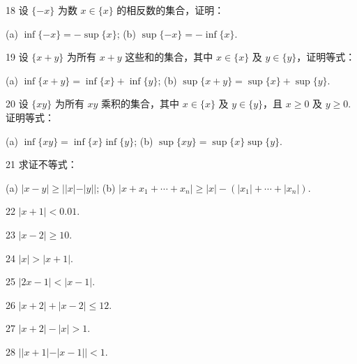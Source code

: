 \begin{prob}[M]{18}
设 $\{-x\}$ 为数 $x \in \{x\}$ 的相反数的集合，证明：

(a) $\inf\{-x\} = -\sup\{x\}$; \qquad (b) $\sup\{-x\} = -\inf\{x\}$.
\end{prob}

\begin{prob}[M]{19}
设 $\{x+y\}$ 为所有 $x+y$ 这些和的集合，其中 $x \in \{x\}$ 及 $y \in \{y\}$，证明等式：

(a) $\inf\{x+y\} = \inf\{x\} + \inf\{y\}$; \qquad (b) $\sup\{x+y\} = \sup\{x\} + \sup\{y\}$.
\end{prob}

\begin{prob}[M]{20}
设 $\{xy\}$ 为所有 $xy$ 乘积的集合，其中 $x \in \{x\}$ 及 $y \in \{y\}$，且 $x \geqslant 0$ 及 $y \geqslant 0$. 证明等式：

(a) $\inf\{xy\} = \inf\{x\}\inf\{y\}$; \qquad (b) $\sup\{xy\} = \sup\{x\}\sup\{y\}$.
\end{prob}

\begin{prob}[M]{21}
求证不等式：

(a) $|x - y| \geqslant ||x| - |y||$; \qquad (b) $|x + x_1 + \cdots + x_n| \geqslant |x| - (|x_1| + \cdots + |x_n|)$.
\end{prob}


\begin{prob}[S]{22}
$|x + 1| < 0.01$.
\end{prob}

\begin{prob}[S]{23}
$|x - 2| \geqslant 10$.
\end{prob}

\begin{prob}[S]{24}
$|x| > |x + 1|$.
\end{prob}

\begin{prob}[S]{25}
$|2x - 1| < |x - 1|$.
\end{prob}

\begin{prob}[S]{26}
$|x + 2| + |x - 2| \leqslant 12$.
\end{prob}

\begin{prob}[S]{27}
$|x + 2| - |x| > 1$.
\end{prob}

\begin{prob}[S]{28}
$||x + 1| - |x - 1|| < 1$.
\end{prob}

